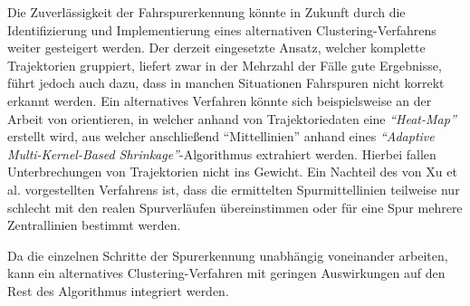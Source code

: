 Die Zuverlässigkeit der Fahrspurerkennung könnte in Zukunft durch die Identifizierung und Implementierung
eines alternativen Clustering-Verfahrens weiter gesteigert werden.
Der derzeit eingesetzte Ansatz, welcher komplette Trajektorien gruppiert, liefert zwar in der Mehrzahl der Fälle
gute Ergebnisse, führt jedoch auch dazu, dass in manchen Situationen Fahrspuren nicht korrekt erkannt werden.
Ein alternatives Verfahren könnte sich beispielsweise an der Arbeit von \cite[]{Xu2015} orientieren, in welcher
anhand von Trajektoriedaten eine \textit{``Heat-Map''} erstellt wird, aus welcher anschließend ``Mittellinien''
anhand eines \textit{``Adaptive Multi-Kernel-Based Shrinkage''}-Algorithmus extrahiert werden.
Hierbei fallen Unterbrechungen von Trajektorien nicht ins Gewicht. Ein Nachteil des von Xu et al. vorgestellten
Verfahrens ist, dass die ermittelten Spurmittellinien teilweise nur schlecht mit den realen Spurverläufen
übereinstimmen oder für eine Spur mehrere Zentrallinien bestimmt werden. 

Da die einzelnen Schritte der Spurerkennung unabhängig voneinander arbeiten, kann ein
alternatives Clustering-Verfahren mit geringen Auswirkungen auf den Rest des Algorithmus integriert werden.